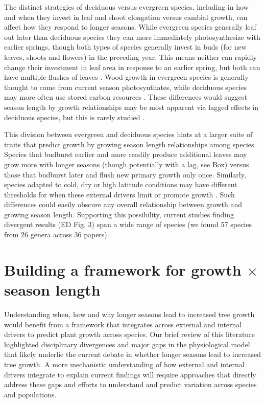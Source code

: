 \documentclass[11pt]{article}
\begin{document}
The distinct strategies of deciduous versus evergreen species, including in how and when they invest in leaf and shoot elongation versus cambial growth, can affect how they respond to longer seasons. While evergreen species generally leaf out later than deciduous species they can more immediately photosynthesize with earlier springs, though both types of species generally invest in buds (for new leaves, shoots and flowers) in the preceding year. This means neither can rapidly change their investment in leaf area in response to an earlier spring, but both can have multiple flushes of leaves \citep{day2011regulation,soolanayakanahally2013timing}. Wood growth in evergreen species is generally thought to come from current season photosynthates, while deciduous species may more often use stored carbon resources \citep{gordon1968seasonal,monson2018finding}. These differences would suggest season length by growth relationships
may be most apparent via lagged effects in deciduous species, but this is rarely studied  \citep[and not clearly supported to date, see][]{coulthard2020limits,klesse2023legacy}. 

This division between evergreen and deciduous species hints at a larger suite of traits that predict growth by growing season length relationships among species. Species that budburst earlier and more readily produce additional leaves \citep[e.g. leaf flushes after budset, and other characteristics more common to `indeterminate' species,][]{kikuzawa1982leaf,Lechowicz:1984cr} may grow more with longer seasons (though potentially with a lag, see Box) versus those that budburst later and flush new primary growth only once. Similarly, species adapted to cold, dry or high latitude conditions may have different thresholds for when these external drivers limit or promote growth \citep[e.g. some \emph{Populus} and \emph{Quercus} species,][and see Fig.3]{soolanayakanahally2013timing,mckown2016impacts,delpierre2017tree,de2022temperature}. Such differences could easily obscure any overall relationship between growth and growing season length. Supporting this possibility, current studies finding divergent results (ED Fig. 3) span a wide range of species (we found  57 species from 26 genera across 36 papers). 

\section*{Building a framework for growth $\times$ season length} %

Understanding when, how and why longer seasons lead to increased tree growth would benefit from a framework that integrates across external and internal drivers to predict plant growth across species. Our brief review of this literature highlighted disciplinary divergences and major gaps in the physiological model \citep[see Box, and ][]{korner2015paradigm,rossi2008critical,rademacher2022insights} that likely underlie the current debate in whether longer seasons lead to increased tree growth. A more mechanistic understanding of how external and internal drivers integrate to explain current findings will require approaches that directly address these gaps and efforts to understand and predict variation across species and populations. 
\end{document}
